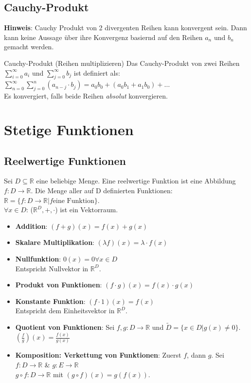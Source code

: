 \documentclass[a4paper]{article}
\newcommand\R{\ensuremath{\mathbb{R}}}
\begin{document}
\subsection{Cauchy-Produkt}
\tiny \color{gray} 
  \textbf{Hinweis}: Cauchy Produkt von 2 divergenten Reihen kann konvergent sein. Dann kann keine Aussage über ihre Konvergenz basiernd auf den Reihen $a_n$ und $b_n$ gemacht werden. 
\normalsize \color{black}
\begin{subbox}{Cauchy-Produkt (Reihen multiplizieren)}
  Das Cauchy-Produkt von zwei Reihen $\sum_{i = 0}^\infty a_i$ und $\sum_{j = 0}^\infty b_j$ ist definiert als: \\
  $\sum_{n=0}^\infty \sum_{j=0}^n (a_{n-j} \cdot b_j) = a_0b_0 + (a_0b_1 + a_1b_0) + \ldots$ \\
  Es konvergiert, falls beide Reihen \textit{absolut} konvergieren. \\
\end{subbox}

\section{Stetige Funktionen}
\subsection{Reelwertige Funktionen}
Sei $D \subseteq \mathbb{R}$ eine beliebige Menge. Eine reelwertige Funktion ist eine Abbildung $f: D \rightarrow \mathbb{R}$.
Die Menge aller auf D definierten Funktionen: $\mathbb{R} = \{f: D \rightarrow \mathbb{R} | f \text{eine Funktion}\}$. \\
$\forall x \in D$: ($\R^D, +, \cdot$) ist ein Vektorraum. \\

\begin{itemize}[leftmargin=4.5mm, topsep=1pt, parsep=1pt]
  \item \textbf{Addition}: $(f+g)(x) = f(x) + g(x)$ \\
  \item \textbf{Skalare Multiplikation}: $(\lambda f)(x) = \lambda \cdot f(x)$
  \item \textbf{Nullfunktion}: $0(x) = 0 \forall x \in D$ \\
  Entspricht Nullvektor in $\mathbb{R}^D$. \\
  \item  \textbf{Produkt von Funktionen}: $(f \cdot g)(x) = f(x) \cdot g(x)$ 
  \item  \textbf{Konstante Funktion}: $(f \cdot 1)(x) = f(x)$ \\
         Entspricht dem Einheitsvektor in $\mathbb{R}^D$. \\
  \item \textbf{Quotient von Funktionen}: Sei $f,g : D \rightarrow \mathbb{R}$ und $\tilde{D} = \{ x \in D | g(x) \neq 0\}$. $(\frac{f}{g})(x) = \frac{f(x)}{g(x)}$ 
  \item \textbf{Komposition: Verkettung von Funktionen}: Zuerst $f$, dann $g$. Sei $f: D \rightarrow \mathbb{R}$ \& $g: E \rightarrow \mathbb{R}$ \\
        $g \circ f: D \rightarrow \mathbb{R}$ mit $(g \circ f)(x) = g(f(x))$.
\end{itemize}
\end{document}
